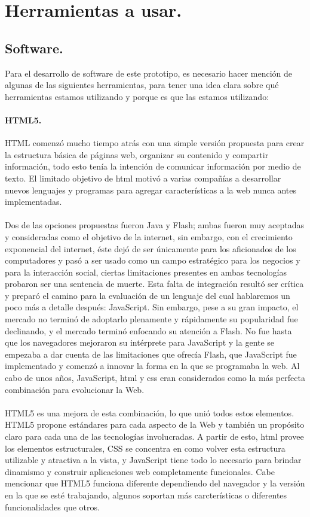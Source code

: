 \documentclass[12pt, a4paper, titlepage]{report}
\begin{document}
    	\section{Herramientas a usar.}
			\subsection{Software.}
			Para el desarrollo de software de este prototipo, es necesario hacer mención de algunas de las siguientes herramientas, para tener una idea clara sobre qué herramientas estamos utilizando y porque es que las estamos utilizando:
			
			\paragraph{HTML5.}
			HTML comenzó mucho tiempo atrás con una simple versión propuesta para crear la estructura básica de páginas web, organizar su contenido y compartir información, todo esto tenía la intención de comunicar información por medio de texto. El limitado objetivo de html motivó a varias compañías a desarrollar nuevos lenguajes y programas para agregar características a la web nunca antes implementadas.   \\\\
			Dos de las opciones propuestas fueron Java y \Gls{Flash}; ambas fueron muy aceptadas y consideradas como el objetivo de la internet, sin embargo, con el crecimiento exponencial del internet, éste dejó de ser únicamente para los aficionados de los computadores y pasó a ser usado como un campo estratégico para los negocios y para la interacción social, ciertas limitaciones presentes en ambas tecnologías probaron ser una sentencia de muerte. Esta falta de integración resultó ser crítica y preparó el camino para la evaluación de un lenguaje del cual hablaremos un poco más a detalle después: JavaScript. Sin embargo, pese a su gran impacto, el mercado no terminó de adoptarlo plenamente y rápidamente su popularidad fue declinando, y el mercado terminó enfocando su atención a Flash. No fue hasta que los navegadores mejoraron su intérprete para JavaScript y la gente se empezaba a dar cuenta de las limitaciones que ofrecía Flash, que JavaScript fue implementado y comenzó a innovar la forma en la que se programaba la web. Al cabo de unos años, JavaScript, html y css eran considerados como la más perfecta combinación para evolucionar la Web. \\\\
			HTML5 es una mejora de esta combinación, lo que unió todos estos elementos. HTML5 propone estándares para cada aspecto de la Web y también un propósito claro para cada una de las tecnologías involucradas. A partir de esto, html provee los elementos estructurales, CSS se concentra en como volver esta estructura utilizable y atractiva a la vista, y JavaScript tiene todo lo necesario para brindar dinamismo y construir aplicaciones web completamente funcionales. Cabe mencionar que HTML5 funciona diferente dependiendo del navegador y la versión en la que se esté trabajando, algunos soportan más carcterísticas o diferentes funcionalidades que otros.
			
\end{document}
